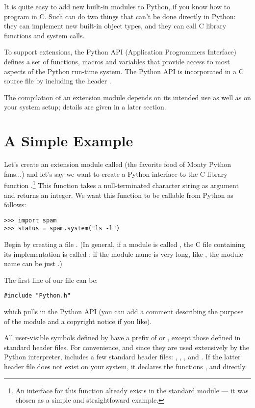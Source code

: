 \documentclass{manual}
\begin{document}
It is quite easy to add new built-in modules to Python, if you know
how to program in C.  Such  can do two things
that can't be done directly in Python: they can implement new built-in
object types, and they can call C library functions and system calls.

To support extensions, the Python API (Application Programmers
Interface) defines a set of functions, macros and variables that
provide access to most aspects of the Python run-time system.  The
Python API is incorporated in a C source file by including the header
.

The compilation of an extension module depends on its intended use as
well as on your system setup; details are given in a later section.


\section{A Simple Example
         \label{simpleExample}}

Let's create an extension module called  (the favorite food
of Monty Python fans...) and let's say we want to create a Python
interface to the C library function .\footnote{An
interface for this function already exists in the standard module
 --- it was chosen as a simple and straightfoward example.}
This function takes a null-terminated character string as argument and
returns an integer.  We want this function to be callable from Python
as follows:

\begin{verbatim}
>>> import spam
>>> status = spam.system("ls -l")
\end{verbatim}

Begin by creating a file .  (In general, if a
module is called , the C file containing its implementation
is called ; if the module name is very long, like
, the module name can be just .)

The first line of our file can be:

\begin{verbatim}
#include "Python.h"
\end{verbatim}

which pulls in the Python API (you can add a comment describing the
purpose of the module and a copyright notice if you like).

All user-visible symbols defined by  have a prefix of
 or , except those defined in standard header files.
For convenience, and since they are used extensively by the Python
interpreter,  includes a few standard header files:
, , , and
.  If the latter header file does not exist on your
system, it declares the functions ,
 and  directly.
\end{document}
